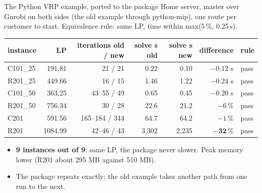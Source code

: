 \documentclass[aspectratio=169]{beamer}
\begin{document}
\begin{frame}{The Python VRP example, ported to the package}
  \small Home server, master over Gurobi on both sides (the old example through python-mip), one route per
  customer to start. Equivalence rule: same LP, time within max(5\,\%, 0.25\,s).

  \vspace{0.3em}
  \footnotesize
  \begin{tabular}{@{}lrrrrrl@{}}
    \toprule
    instance & LP & iterations old / new & solve s old & solve s new & difference & rule \\
    \midrule
    C101\_25 & 191.81 & 21 / 21 & 0.22 & 0.10 & $-0.12$ s & pass \\
    R201\_25 & 449.66 & 16 / 15 & 1.46 & 1.22 & $-0.24$ s & pass \\
    C101\_50 & 363.25 & 43--55 / 49 & 0.65 & 0.45 & $-0.20$ s & pass \\
    R201\_50 & 756.34 & 30 / 28 & 22.6 & 21.2 & $-6$\,\% & pass \\
    C201 & 591.56 & 165--184 / 344 & 64.7 & 64.2 & $-1$\,\% & pass \\
    R201 & 1084.99 & 42--46 / 43 & 3,302 & 2,235 & $\mathbf{-32}$\,\% & pass \\
    \bottomrule
  \end{tabular}

  \vspace{0.5em}
  \begin{itemize}\small
    \item \textbf{9 instances out of 9}: same LP, the package never slower. Peak memory lower (R201 about 295 MB
      against 510 MB).
    \item The package repeats exactly; the old example takes another path from one run to the next.
  \end{itemize}
\end{frame}
\end{document}
